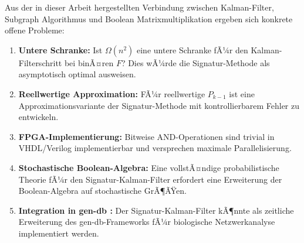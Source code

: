 ﻿\documentclass[a4paper,12pt]{article}
\theoremstyle{definition}
\begin{document}
Aus der in dieser Arbeit hergestellten Verbindung zwischen Kalman-Filter, Subgraph
Algorithmus \cite{epp2026} und Boolean Matrixmultiplikation \cite{epp2026boolmm}
ergeben sich konkrete offene Probleme:
\begin{enumerate}
    \item \textbf{Untere Schranke:} Ist $\Omega(n^2)$ eine untere Schranke fÃ¼r den
          Kalman-Filterschritt bei binÃ¤ren $F$? Dies wÃ¼rde die Signatur-Methode als
          asymptotisch optimal ausweisen.
    \item \textbf{Reellwertige Approximation:} FÃ¼r reellwertige $P_{k-1}$ ist eine
          Approximationsvariante der Signatur-Methode mit kontrollierbarem Fehler zu entwickeln.
    \item \textbf{FPGA-Implementierung:} Bitweise AND-Operationen sind trivial in
          VHDL/Verilog implementierbar und versprechen maximale Parallelisierung.
    \item \textbf{Stochastische Boolean-Algebra:} Eine vollstÃ¤ndige probabilistische
          Theorie fÃ¼r den Signatur-Kalman-Filter erfordert eine Erweiterung der
          Boolean-Algebra auf stochastische GrÃ¶ÃŸen.
    \item \textbf{Integration in gen-db \cite{epp2026bio}:} Der Signatur-Kalman-Filter
          kÃ¶nnte als zeitliche Erweiterung des gen-db-Frameworks fÃ¼r biologische
          Netzwerkanalyse implementiert werden.
\end{enumerate}
\end{document}

